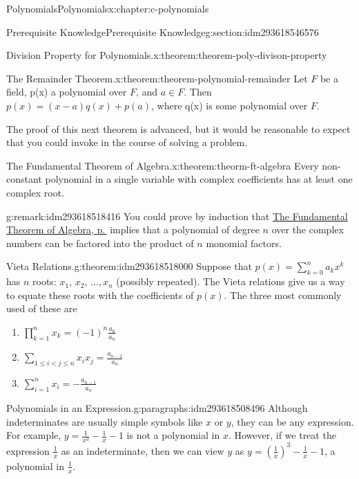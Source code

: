 \documentclass[twoside,10pt,]{book}
\numberwithin{equation}{section}
\newcommand{\lt}{<}
\begin{document}
\begin{chapterptx}{Polynomials}{}{Polynomials}{}{}{x:chapter:c-polynomials}
\begin{sectionptx}{Prerequisite Knowledge}{}{Prerequisite Knowledge}{}{}{g:section:idm293618546576}
\begin{theorem}{Division Property for Polynomials.}{}{x:theorem:theorem-poly-divison-property}
\end{theorem}
\begin{theorem}{The Remainder Theorem.}{}{x:theorem:theorem-polynomial-remainder}%
%
Let \(F\) be a field, p(x) a polynomial over \(F\), and \(a \in  F\). Then \(p(x) = (x-a)q(x) + p(a)\), where q(x) is some polynomial over \(F\).%
\end{theorem}
The proof of this next theorem is advanced, but it would be reasonable to expect that you could invoke in the course of solving a problem.%
\begin{theorem}{The  Fundamental Theorem of Algebra.}{}{x:theorem:theorm-ft-algebra}%
%
Every non-constant polynomial in a single variable with complex coefficients has at least one complex root.%
\end{theorem}
\begin{remark}{}{g:remark:idm293618518416}%
You could prove by induction that \hyperref[x:theorem:theorm-ft-algebra]{The  Fundamental Theorem of Algebra, p.\,\pageref{x:theorem:theorm-ft-algebra}} implies that a polynomial of degree \(n\) over the complex numbers can be factored into the product of \(n\) monomial factors.%
\end{remark}
\begin{theorem}{Vieta Relations.}{}{g:theorem:idm293618518000}%
%
Suppose that  \(p(x) = \sum_{k=0}^n a_k x^k\) has \(n\) roots: \(x_1\), \(x_2\), \(\ldots , x_n\) (possibly repeated).  The Vieta relations give us a way to equate these roots with the coefficients of \(p(x)\). The three most commonly used of these are%
\begin{enumerate}
\item{}\(\displaystyle \prod_{k=1}^n x_k = (-1)^n \frac{a_0}{a_n}\)%
\item{}\(\displaystyle \sum_{1\le i \lt j\le n} x_i x_j = \frac{a_{n-2}}{a_n}\)%
\item{}\(\displaystyle \sum_{i=1}^n x_i = - \frac{a_{n-1}}{a_n}\)%
\end{enumerate}
%
\end{theorem}
\begin{paragraphs}{Polynomials in an Expression.}{g:paragraphs:idm293618508496}%
Although indeterminates are usually simple symbols like \(x\) or \(y\), they can be any expression. For example, \(y =\frac{1}{x^3}-\frac{1}{x} -1\) is not a polynomial in \(x\).  However, if we treat the expression \(\frac{1}{x}\) as an indeterminate, then we can view \(y\) as  \(y =(\frac{1}{x})^3-\frac{1}{x} -1\), a polynomial in \(\frac{1}{x}\).%

\end{paragraphs}
\end{sectionptx}
\end{chapterptx}
\end{document}
